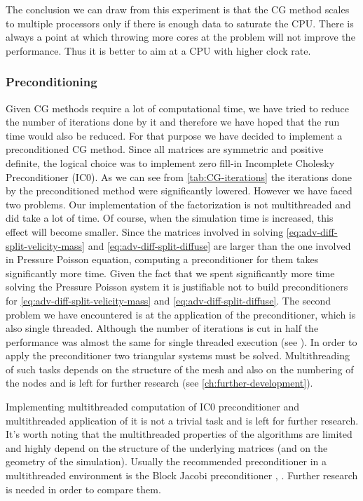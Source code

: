 The conclusion we can draw from this experiment is that the CG method scales to multiple processors only if there is enough data to saturate the CPU. There is always a point at which throwing more cores at the problem will not improve the performance. Thus it is better to aim at a CPU with higher clock rate.

\subsubsection{Preconditioning}

Given CG methods require a lot of computational time, we have tried to reduce the number of iterations done by it and therefore we have hoped that the run time would also be reduced. For that purpose we have decided to implement a preconditioned CG method. Since all matrices are symmetric and positive definite, the logical choice was to implement zero fill-in Incomplete Cholesky Preconditioner (IC0). As we can see from \cref{tab:CG-iterations} the iterations done by the preconditioned method were significantly lowered. However we have faced two problems. Our implementation of the factorization is not multithreaded and did take a lot of time. Of course, when the simulation time is increased, this effect will become smaller. Since the matrices involved in solving \cref{eq:adv-diff-split-velicity-mass} and \cref{eq:adv-diff-split-diffuse} are larger than the one involved in Pressure Poisson equation, computing a preconditioner for them takes significantly more time. Given the fact that we spent significantly more time solving the Pressure Poisson system it is justifiable not to build preconditioners for \cref{eq:adv-diff-split-velicity-mass} and \cref{eq:adv-diff-split-diffuse}. The second problem we have encountered is at the application of the preconditioner, which is also single threaded. Although the number of iterations is cut in half the performance was almost the same for single threaded execution (see ). In order to apply the preconditioner two triangular systems must be solved. Multithreading of such tasks depends on the structure of the mesh and also on the numbering of the nodes and is left for further research (see \cref{ch:further-development}).

Implementing multithreaded computation of IC0 preconditioner and multithreaded application of it is not a trivial task and is left for further research. It's worth noting that the multithreaded properties of the algorithms are limited and highly depend on the structure of the underlying matrices (and on the geometry of the simulation). Usually the recommended preconditioner in a multithreaded environment is the Block Jacobi preconditioner \cite{Bridson}, \cite{saad-sparse}. Further research is needed in order to compare them.

